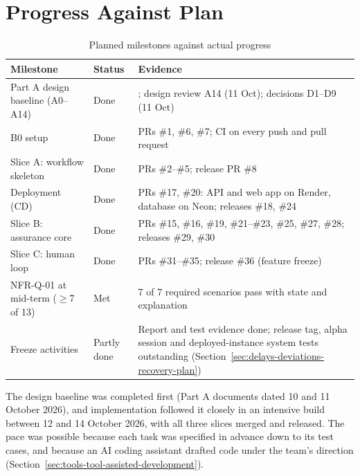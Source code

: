 \section{Progress Against Plan}\label{sec:progress-against-plan}
\begin{table}[H]
\centering
\caption{Planned milestones against actual progress}\label{tab:planned-milestones-against-actual}
\begin{tabular}{@{}L{98pt}L{56pt}L{213pt}@{}}
\toprule
Milestone & Status & Evidence \\
\midrule
Part A design baseline (A0--A14) & Done & ; design review A14 (11 Oct); decisions D1--D9 (11 Oct) \\
B0 setup & Done & PRs \#1, \#6, \#7; CI on every push and pull request \\
Slice A: workflow skeleton & Done & PRs \#2--\#5; release PR \#8 \\
Deployment (CD) & Done & PRs \#17, \#20: API and web app on Render, database on Neon; releases \#18, \#24 \\
Slice B: assurance core & Done & PRs \#15, \#16, \#19, \#21--\#23, \#25, \#27, \#28; releases \#29, \#30 \\
Slice C: human loop & Done & PRs \#31--\#35; release \#36 (feature freeze) \\
NFR-Q-01 at mid-term ($\geq$7 of 13) & Met & 7 of 7 required scenarios pass with state and explanation \\
Freeze activities & Partly done & Report and test evidence done; release tag, alpha session and deployed-instance system tests outstanding (Section~\ref{sec:delays-deviations-recovery-plan}) \\
\bottomrule
\end{tabular}
\end{table}
The design baseline was completed first (Part A documents dated 10 and 11 October 2026), and implementation followed it closely in an intensive build between 12 and 14 October 2026, with all three slices merged and released. The pace was possible because each task was specified in advance down to its test cases, and because an AI coding assistant drafted code under the team's direction (Section~\ref{sec:tools-tool-assisted-development}).

